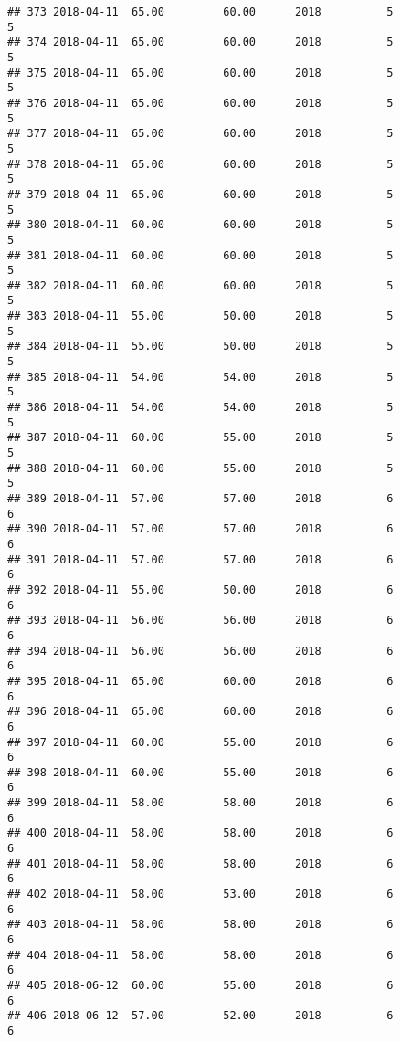 \documentclass[]{article}
\begin{document}
\begin{verbatim}
## 373 2018-04-11  65.00         60.00      2018          5                 5
## 374 2018-04-11  65.00         60.00      2018          5                 5
## 375 2018-04-11  65.00         60.00      2018          5                 5
## 376 2018-04-11  65.00         60.00      2018          5                 5
## 377 2018-04-11  65.00         60.00      2018          5                 5
## 378 2018-04-11  65.00         60.00      2018          5                 5
## 379 2018-04-11  65.00         60.00      2018          5                 5
## 380 2018-04-11  60.00         60.00      2018          5                 5
## 381 2018-04-11  60.00         60.00      2018          5                 5
## 382 2018-04-11  60.00         60.00      2018          5                 5
## 383 2018-04-11  55.00         50.00      2018          5                 5
## 384 2018-04-11  55.00         50.00      2018          5                 5
## 385 2018-04-11  54.00         54.00      2018          5                 5
## 386 2018-04-11  54.00         54.00      2018          5                 5
## 387 2018-04-11  60.00         55.00      2018          5                 5
## 388 2018-04-11  60.00         55.00      2018          5                 5
## 389 2018-04-11  57.00         57.00      2018          6                 6
## 390 2018-04-11  57.00         57.00      2018          6                 6
## 391 2018-04-11  57.00         57.00      2018          6                 6
## 392 2018-04-11  55.00         50.00      2018          6                 6
## 393 2018-04-11  56.00         56.00      2018          6                 6
## 394 2018-04-11  56.00         56.00      2018          6                 6
## 395 2018-04-11  65.00         60.00      2018          6                 6
## 396 2018-04-11  65.00         60.00      2018          6                 6
## 397 2018-04-11  60.00         55.00      2018          6                 6
## 398 2018-04-11  60.00         55.00      2018          6                 6
## 399 2018-04-11  58.00         58.00      2018          6                 6
## 400 2018-04-11  58.00         58.00      2018          6                 6
## 401 2018-04-11  58.00         58.00      2018          6                 6
## 402 2018-04-11  58.00         53.00      2018          6                 6
## 403 2018-04-11  58.00         58.00      2018          6                 6
## 404 2018-04-11  58.00         58.00      2018          6                 6
## 405 2018-06-12  60.00         55.00      2018          6                 6
## 406 2018-06-12  57.00         52.00      2018          6                 6

\end{verbatim}
\end{document}
